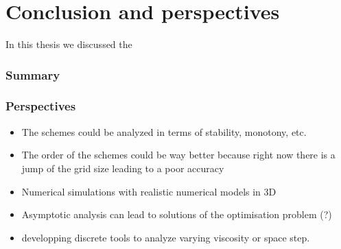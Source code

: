 \chapter*{Conclusion and perspectives}
\label{ch:conclusion}
In this thesis we discussed the 
\subsection{Summary}
\subsection{Perspectives}
\begin{itemize}
\item The schemes could be analyzed in terms of stability, monotony,
	etc.
\item The order of the schemes could be way better because right now
	there is a jump of the grid size leading to a poor accuracy
\item Numerical simulations with realistic numerical models in
	3D
\item Asymptotic analysis can lead to solutions of the optimisation
problem (?)
\item developping discrete tools to analyze varying viscosity or
space step.
\end{itemize}
